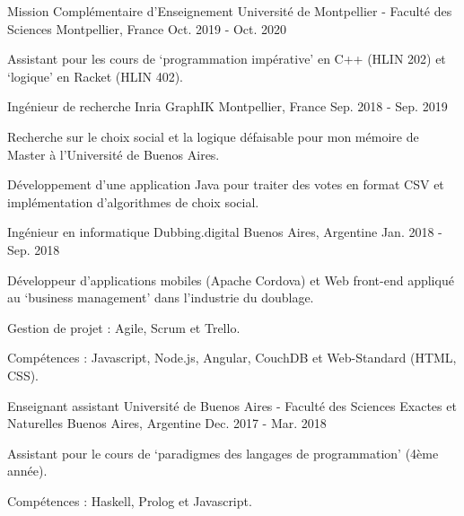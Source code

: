 

\begin{cventries}

\cventry
{Mission Complémentaire d'Enseignement} %
{Université de Montpellier - Faculté des Sciences} %
{Montpellier, France} %
{Oct. 2019 - Oct. 2020} %
{
  \begin{cvitems} %
    \item Assistant pour les cours de `programmation imp\'erative' en C++ (HLIN 202) et `logique' en Racket (HLIN 402).
  \end{cvitems}
}
  
\cventry
{Ingénieur de recherche}
{Inria GraphIK}
{Montpellier, France}
{Sep. 2018 - Sep. 2019}
{
\begin{cvitems}
\item Recherche sur le choix social et la logique défaisable pour mon mémoire de Master à l'Université de Buenos Aires.
\item Développement d'une application Java pour traiter des votes en format CSV et implémentation d'algorithmes de choix social.
\end{cvitems}
}  

\cventry
{Ingénieur en informatique}
{Dubbing.digital}
{Buenos Aires, Argentine}
{Jan. 2018 - Sep. 2018}
{
\begin{cvitems}
\item Développeur d'applications mobiles (Apache Cordova) et Web front-end appliqué au `business management' dans l'industrie du doublage. 
\item Gestion de projet : Agile, Scrum et Trello.
\item Compétences : Javascript, Node.js, Angular, CouchDB et Web-Standard (HTML, CSS).
\end{cvitems}
} 

\cventry
{Enseignant assistant} %
{Université de Buenos Aires - Faculté des Sciences Exactes et Naturelles} %
{Buenos Aires, Argentine} %
{Dec. 2017 - Mar. 2018} %
{
  \begin{cvitems} %
    \item Assistant pour le cours de `paradigmes des langages de programmation' (4ème année). 
    \item Compétences : Haskell, Prolog et Javascript.
  \end{cvitems}
}



\end{cventries}
